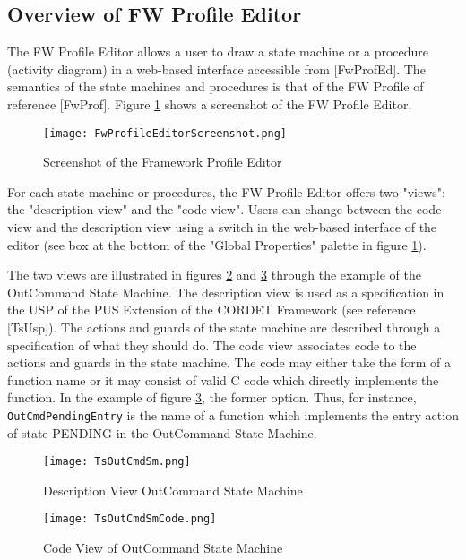 \documentclass{pnp_article}
\begin{document}
\subsection{Overview of FW Profile Editor}
The FW Profile Editor allows a user to draw a state machine or a procedure (activity diagram) in a web-based interface accessible from [FwProfEd]. The semantics of the state machines and procedures is that of the FW Profile of reference [FwProf]. Figure \ref{fig:FwProfileEditorScreenshot} shows a screenshot of the FW Profile Editor.

\begin{figure}[htbp]
 \centering
 \texttt{[image: FwProfileEditorScreenshot.png]}
 \caption{Screenshot of the Framework Profile Editor}
 \label{fig:FwProfileEditorScreenshot}
\end{figure}

For each state machine or procedures, the FW Profile Editor offers two "views": the "description view" and the "code view". Users can change between the code view and the description view using a switch in the web-based interface of the editor (see box at the bottom of the "Global Properties" palette in figure \ref{fig:FwProfileEditorScreenshot}).

The two views are illustrated in figures \ref{fig:TsOutCmdSm} and \ref{fig:TsOutCmdSmCode} through the example of the OutCommand State Machine. The description view is used as a specification in the USP of the PUS Extension of the CORDET Framework (see reference [TsUsp]). The actions and guards of the state machine are described through a specification of what they should do. The code view associates code to the actions and guards in the state machine. The code may either take the form of a function name or it may consist of valid C code which directly implements the function. In the example of figure \ref{fig:TsOutCmdSmCode}, the former option. Thus, for instance, \texttt{OutCmdPendingEntry} is the name of a function which implements the entry action of state PENDING in the OutCommand State Machine.


\begin{figure}[H]
 \centering
 \texttt{[image: TsOutCmdSm.png]}
 \caption{Description View OutCommand State Machine}
 \label{fig:TsOutCmdSm}
\end{figure}


\begin{figure}[H]
 \centering
 \texttt{[image: TsOutCmdSmCode.png]}
 \caption{Code View of OutCommand State Machine}
 \label{fig:TsOutCmdSmCode}
\end{figure}
\end{document}
